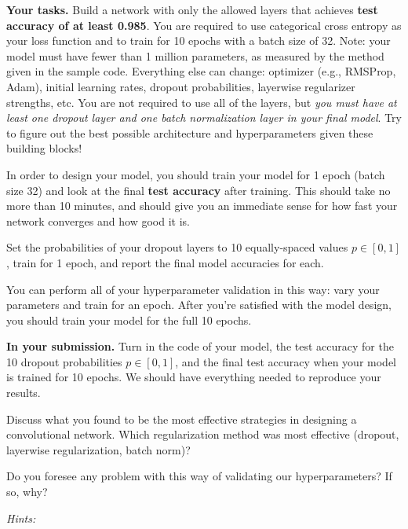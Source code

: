 \textbf{Your tasks.} Build a network with only the allowed layers that achieves \textbf{test accuracy of at least 0.985}. You are required to use categorical cross entropy as your loss function and to train for 10 epochs with a batch size of 32. Note: your model must have fewer than 1 million parameters, as measured by the method given in the sample code.
Everything else can change: optimizer (e.g., RMSProp, Adam), initial learning rates, dropout probabilities, layerwise regularizer strengths, etc. You are not required to use all of the layers, but \emph{you must have
at least one dropout layer and one batch normalization layer in your final model}. Try to figure out the best possible architecture and hyperparameters given these building blocks!

In order to design your model, you should train your model for 1 epoch (batch size 32) and look at the final \textbf{test accuracy}  after training. This should take no more than 10 minutes, and should give you an immediate sense for how fast your network converges and how good it is.

Set the probabilities of your
dropout layers to 10 equally-spaced values $p \in [0, 1]$, train for 1 epoch, and report the final model accuracies for each.

You can perform all of your hyperparameter validation in this way: vary your parameters and train for an epoch. After you're satisfied with the model design, you should train your model for the full 10 epochs.

\textbf{In your submission.} Turn in the code of your model, the test accuracy for the 10 dropout probabilities $p \in [0, 1]$, and the
final test accuracy when your model
is trained for 10 epochs. We should have everything needed to reproduce your results.

Discuss what you found to be the most effective strategies in designing a convolutional network. Which regularization method was most effective (dropout, layerwise regularization, batch norm)?

Do you foresee any problem with this way of validating our hyperparameters? If so, why?

\emph{Hints:}

